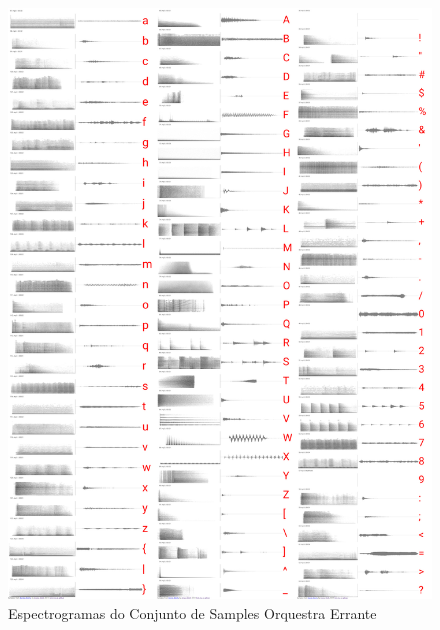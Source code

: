 \begin{figure}
    \caption{\label{samplesorquestra}Espectrogramas do Conjunto de Samples Orquestra Errante}
    \begin{center}
        \includegraphics[width=1\linewidth]{pictures/cap3/bandaorquestra.jpg}
    \end{center}
\end{figure}

\newpage
